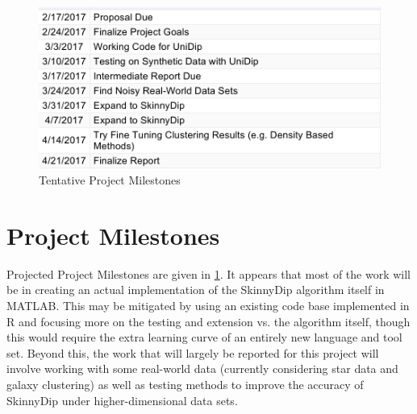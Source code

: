 \documentclass{sig-alternate-05-2015}
\begin{document}
\begin{figure}[t]
\centering
\includegraphics[width=\textwidth]{images/timeline}
\caption{Tentative Project Milestones}
\label{fig:milestones}
\end{figure}

\section{Project Milestones}
Projected Project Milestones are given in \ref{fig:milestones}. It appears that most of the work will be in creating an actual implementation of the SkinnyDip algorithm itself in MATLAB. This may be mitigated by using an existing code base implemented in R and focusing more on the testing and extension vs. the algorithm itself, though this would require the extra learning curve of an entirely new language and tool set. Beyond this, the work that will largely be reported for this project will involve working with some real-world data (currently considering star data and galaxy clustering) as well as testing methods to improve the accuracy of SkinnyDip under higher-dimensional data sets.


\end{document}
